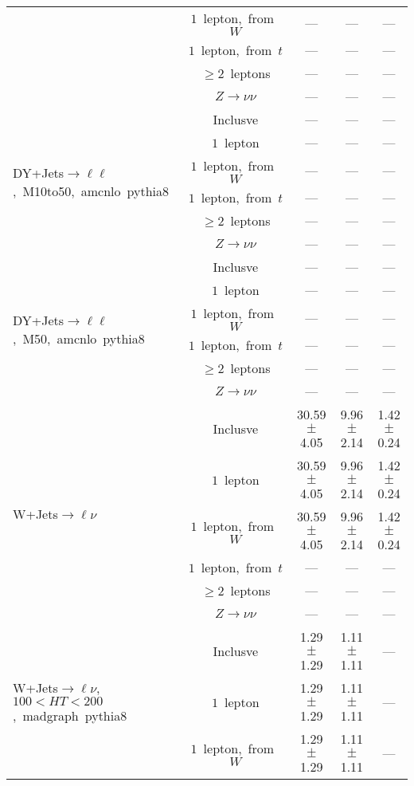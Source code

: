 \documentclass{article}
\begin{document}
\begin{longtable}{|l|c|c|c|c|}
 & $1$~lepton,~from~$W$  & ---  & ---  & --- \\* 
 & $1$~lepton,~from~$t$  & ---  & ---  & --- \\* 
 & $\ge2$~leptons  & ---  & ---  & --- \\* 
 & $Z\rightarrow\nu\nu$  & ---  & ---  & --- \\* 
\hline 
\multirow{6}{*}{DY+Jets$\rightarrow\ell\ell$,~M10to50,~amcnlo~pythia8} & Inclusve  & ---  & ---  & --- \\* 
 & $1$~lepton  & ---  & ---  & --- \\* 
 & $1$~lepton,~from~$W$  & ---  & ---  & --- \\* 
 & $1$~lepton,~from~$t$  & ---  & ---  & --- \\* 
 & $\ge2$~leptons  & ---  & ---  & --- \\* 
 & $Z\rightarrow\nu\nu$  & ---  & ---  & --- \\* 
\hline 
\multirow{6}{*}{DY+Jets$\rightarrow\ell\ell$,~M50,~amcnlo~pythia8} & Inclusve  & ---  & ---  & --- \\* 
 & $1$~lepton  & ---  & ---  & --- \\* 
 & $1$~lepton,~from~$W$  & ---  & ---  & --- \\* 
 & $1$~lepton,~from~$t$  & ---  & ---  & --- \\* 
 & $\ge2$~leptons  & ---  & ---  & --- \\* 
 & $Z\rightarrow\nu\nu$  & ---  & ---  & --- \\* 
\hline 
\multirow{6}{*}{W+Jets$\rightarrow\ell\nu$} & Inclusve  & 30.59 $\pm$ 4.05  & 9.96 $\pm$ 2.14  & 1.42 $\pm$ 0.24 \\* 
 & $1$~lepton  & 30.59 $\pm$ 4.05  & 9.96 $\pm$ 2.14  & 1.42 $\pm$ 0.24 \\* 
 & $1$~lepton,~from~$W$  & 30.59 $\pm$ 4.05  & 9.96 $\pm$ 2.14  & 1.42 $\pm$ 0.24 \\* 
 & $1$~lepton,~from~$t$  & ---  & ---  & --- \\* 
 & $\ge2$~leptons  & ---  & ---  & --- \\* 
 & $Z\rightarrow\nu\nu$  & ---  & ---  & --- \\* 
\hline 
\multirow{6}{*}{W+Jets$\rightarrow\ell\nu$,~$100<HT<200$,~madgraph~pythia8} & Inclusve  & 1.29 $\pm$ 1.29  & 1.11 $\pm$ 1.11  & --- \\* 
 & $1$~lepton  & 1.29 $\pm$ 1.29  & 1.11 $\pm$ 1.11  & --- \\* 
 & $1$~lepton,~from~$W$  & 1.29 $\pm$ 1.29  & 1.11 $\pm$ 1.11  & --- \\* 

\end{longtable}
\end{document}
